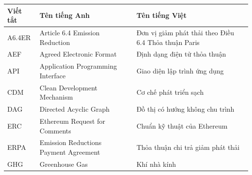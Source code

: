 \documentclass[a4paper,oneside]{report}
\begin{document}
\begin{longtable}{@{}p{2.4cm}p{5.4cm}p{6.3cm}@{}}
\toprule
\textbf{Viết tắt} & \textbf{Tên tiếng Anh} & \textbf{Tên tiếng Việt} \\
\midrule
\endhead
\bottomrule
\endfoot
A6.4ER & Article 6.4 Emission Reduction           & Đơn vị giảm phát thải theo Điều 6.4 Thỏa thuận Paris \\
AEF    & Agreed Electronic Format                  & Định dạng điện tử thỏa thuận \\
API    & Application Programming Interface         & Giao diện lập trình ứng dụng \\
CDM    & Clean Development Mechanism               & Cơ chế phát triển sạch \\
DAG    & Directed Acyclic Graph                    & Đồ thị có hướng không chu trình \\
ERC    & Ethereum Request for Comments             & Chuẩn kỹ thuật của Ethereum \\
ERPA   & Emission Reductions Payment Agreement     & Thỏa thuận chi trả giảm phát thải \\
GHG    & Greenhouse Gas                            & Khí nhà kính \\

\end{longtable}
\end{document}
